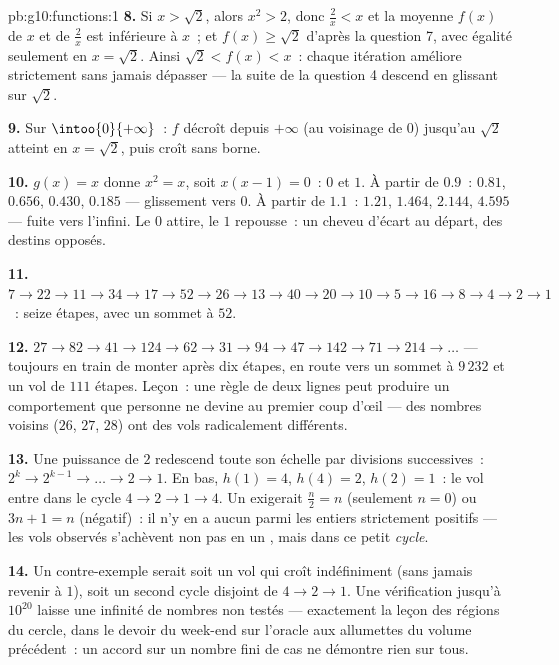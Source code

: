 \begin{solution}{pb:g10:functions:1}
\textbf{8.} Si $x > \sqrt2$, alors $x^2 > 2$, donc $\frac2x < x$ et
la moyenne $f(x)$ de $x$ et de $\frac2x$ est inférieure à $x$~; et
$f(x) \geq \sqrt2$ d'après la question 7, avec égalité seulement en
$x = \sqrt2$. Ainsi $\sqrt2 < f(x) < x$~: chaque itération améliore
strictement sans jamais dépasser --- la suite de la question 4
descend en glissant sur $\sqrt2$.

\textbf{9.} Sur $\intoo{0}{+\infty}$~: $f$ décroît depuis $+\infty$
(au voisinage de $0$) jusqu'au  $\sqrt2$ atteint en
$x = \sqrt2$, puis croît sans borne.

\textbf{10.} $g(x) = x$ donne $x^2 = x$, soit $x(x - 1) = 0$~:  $0$ et $1$. À partir de $0.9$~: $0.81$, $0.656$, $0.430$,
$0.185$ --- glissement vers $0$. À partir de $1.1$~: $1.21$,
$1.464$, $2.144$, $4.595$ --- fuite vers l'infini. Le  $0$
attire, le  $1$ repousse~: un cheveu d'écart au départ,
des destins opposés.

\textbf{11.} $7 \to 22 \to 11 \to 34 \to 17 \to 52 \to 26 \to
13 \to 40 \to 20 \to 10 \to 5 \to 16 \to 8 \to 4 \to 2 \to 1$~:
seize étapes, avec un sommet à $52$.

\textbf{12.} $27 \to 82 \to 41 \to 124 \to 62 \to 31 \to 94 \to
47 \to 142 \to 71 \to 214 \to \dots$ --- toujours en train de monter
après dix étapes, en route vers un sommet à $9\,232$ et un vol de
$111$ étapes. Leçon~: une règle de deux lignes peut produire un
comportement que personne ne devine au premier coup d'œil --- des
nombres voisins ($26$, $27$, $28$) ont des vols radicalement
différents.

\textbf{13.} Une puissance de $2$ redescend toute son échelle par
divisions successives~: $2^k \to 2^{k-1} \to \dots \to 2 \to 1$. En
bas, $h(1) = 4$, $h(4) = 2$, $h(2) = 1$~: le vol entre dans le cycle
$4 \to 2 \to 1 \to 4$. Un  exigerait $\frac n2 = n$
(seulement $n = 0$) ou $3n + 1 = n$ (négatif)~: il n'y en a aucun
parmi les entiers strictement positifs --- les vols observés
s'achèvent non pas en un , mais dans ce petit \emph{cycle}.

\textbf{14.} Un contre-exemple serait soit un vol qui croît
indéfiniment (sans jamais revenir à $1$), soit un second cycle
disjoint de $4 \to 2 \to 1$. Une vérification jusqu'à $10^{20}$
laisse une infinité de nombres non testés --- exactement la leçon des
régions du cercle, dans le devoir du week-end sur l'oracle aux
allumettes du volume précédent~: un accord sur un nombre fini de cas
ne démontre rien sur tous.


\end{solution}
